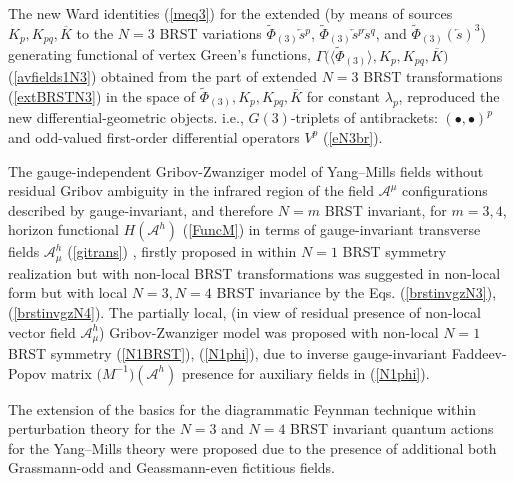 \documentclass[10pt]{article}
\begin{document}
The new  Ward identities (\ref{meq3})
for the extended (by means of sources $K_{p},  K_{pq}, \overline{K}$ to the $N=3$ BRST variations $\widetilde{\Phi}_{(3)} \overleftarrow{s}{}^p$,
$\widetilde{\Phi}{}_{(3)} \overleftarrow{s}{}^p\overleftarrow{s}{}^q$, and $\widetilde{\Phi}{}_{(3)} (\overleftarrow{s})^3$)   generating functional of vertex Green's functions, $\Gamma\big(\langle\widetilde{\Phi}_{(3)}\rangle, K_{p},  K_{pq}, \overline{K}\big)$ (\ref{avfields1N3}) obtained from the part of extended $N=3$ BRST transformations (\ref{extBRSTN3}) in the space of $\widetilde{\Phi}_{(3)}, K_{p},  K_{pq}, \overline{K}$ for constant $\lambda_p$,  reproduced the new
differential-geometric objects. i.e., $G(3)$-triplets of antibrackets: $(\bullet,\bullet)^p$
and odd-valued first-order differential operators  $V^p$ (\ref{eN3br}).

The gauge-independent Gribov-Zwanziger model of Yang--Mills fields without residual Gribov ambiguity in the infrared region of the field $\mathcal{A}^\mu$ configurations described by gauge-invariant, and therefore $N=m$ BRST invariant, for $m=3,4$, horizon functional $H(\mathcal{A}^h)$ (\ref{FuncM}) in terms of gauge-invariant transverse fields $\mathcal{A}^h_\mu$ (\ref{gitrans}) \cite{SemenovTyanshan}, firstly proposed in \cite{Pereira} within $N=1$ BRST symmetry realization but with non-local BRST transformations was suggested in non-local form but with local $N=3, N=4$ BRST invariance by the Eqs. (\ref{brstinvgzN3}), (\ref{brstinvgzN4}). The partially local, (in view of residual presence of non-local vector  field $\mathcal{A}^h_\mu$) Gribov-Zwanziger model was proposed with non-local $N=1$ BRST symmetry (\ref{N1BRST}), (\ref{N1phi}), due to inverse gauge-invariant Faddeev-Popov matrix $\big(M^{-1}\big)(\mathcal{A}^h)$ presence for auxiliary fields in (\ref{N1phi}).

The extension of the basics for the diagrammatic Feynman technique within perturbation theory for the $N=3$ and $N=4$ BRST invariant quantum actions for the Yang--Mills theory were proposed due to the presence of additional  both Grassmann-odd and Geassmann-even fictitious fields.
\end{document}
